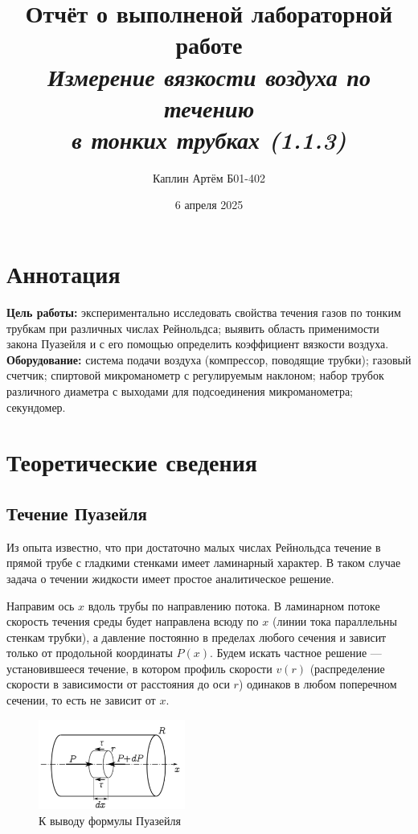 \documentclass[a4paper,12pt]{article}
\title{\textbf{Отчёт о выполненой лабораторной работе \\ \textit{Измерение вязкости воздуха по течению \\
в тонких трубках (1.1.3)}}}
\author{Каплин Артём Б01-402}
\date{6 апреля 2025}
\begin{document}
\maketitle

	\section{Аннотация}

	\textbf{Цель работы:} экспериментально исследовать свойства течения газов по тонким трубкам при различных числах Рейнольдса; выявить область применимости закона Пуазейля и с его помощью определить коэффициент вязкости воздуха. \\
    \newline
    \textbf{Оборудование:}  система подачи воздуха (компрессор, поводящие трубки); газовый счетчик; спиртовой микроманометр с регулируемым наклоном; набор трубок различного диаметра с выходами для подсоединения микроманометра; секундомер.

    \section{Теоретические сведения}
    \subsection{Течение Пуазейля}

   Из опыта известно, что при достаточно малых числах Рейнольдса течение в прямой трубе с гладкими стенками имеет ламинарный характер. В таком случае задача о течении жидкости имеет простое аналитическое решение.

    Направим ось $x$ вдоль трубы по направлению потока. В ламинарном потоке скорость течения среды будет направлена всюду по $x$ (линии тока параллельны стенкам трубки), а давление постоянно в пределах любого сечения и зависит только от продольной координаты $P(x)$. Будем искать частное решение — установившееся течение, в котором профиль скорости $v(r)$ (распределение скорости в зависимости от расстояния до оси $r$) одинаков в любом поперечном сечении, то есть не зависит от $x$.
    
    \begin{figure}
        \centering
        \includegraphics[width=0.43\textwidth]{Пуазейль.png}
        \caption{К выводу формулы Пуазейля}
    \end{figure}
    
\end{document}
